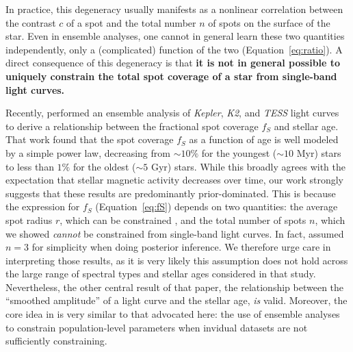 \documentclass[modern]{aastex62}
\begin{document}
In practice, this degeneracy usually manifests as a nonlinear correlation
between the contrast $c$ of a spot and the total number $n$
of spots on the surface of the star. Even in ensemble analyses,
one cannot in general learn these two quantities independently,
only a (complicated) function of the two (Equation~\ref{eq:ratio}).
%
A direct consequence of this degeneracy is that \textbf{it is not in general
    possible to uniquely constrain the total spot coverage of
    a star from single-band light curves.}

Recently, \citet{Morris2020} performed an ensemble analysis of
\emph{Kepler}, \emph{K2}, and \emph{TESS}
light curves to derive a relationship between the fractional spot
coverage $f_S$ and stellar age.
%
That work found that the spot coverage $f_S$ as a
function of age is well modeled by a simple power law, decreasing from
${\sim}10\%$ for the youngest (${\sim}10$ Myr) stars
to less than $1\%$ for the oldest (${\sim}5$ Gyr) stars.
%
While this broadly agrees with the expectation that stellar
magnetic activity decreases over time, our work strongly suggests
that these results are predominantly prior-dominated.
%
This is because the expression for $f_S$ (Equation~\ref{eq:fS}) depends on
two quantities: the average spot radius $r$, which can be
constrained \citep[see][]{PaperII}, and the total number of spots $n$, which
we showed \emph{cannot} be constrained from single-band light curves.
%
In fact, \citet{Morris2020} assumed $n=3$ for simplicity when doing
posterior inference. We therefore urge care in interpreting those results,
as it is very likely this assumption does not hold across the large
range of spectral types and stellar ages considered in that study.
%
Nevertheless, the other central result of that paper, the relationship
between the ``smoothed amplitude'' of a light curve and the stellar age,
\emph{is} valid.
%
Moreover, the core idea in \citet{Morris2020}
\citep[and in related studies such as][]{Jackson2013}
is very similar
to that advocated here: the use of ensemble analyses to constrain population-level
parameters when invidual datasets are not sufficiently constraining.
\end{document}

